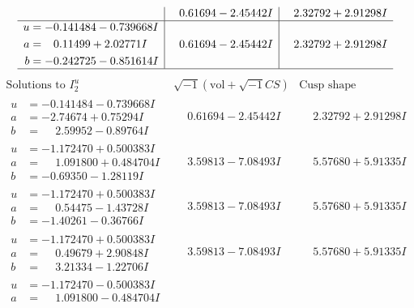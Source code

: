 \documentclass[1p]{elsarticle_modified}
\theoremstyle{definition}
\newcommand{\I}{\sqrt{-1}}
\begin{document}
$$\begin{array}{c|c|c}
 & \phantom{-}0.61694 - 2.45442 I & \phantom{-}2.32792 + 2.91298 I \\ \hline\begin{aligned}
u &= -0.141484 - 0.739668 I \\
a &= \phantom{-}0.11499 + 2.02771 I \\
b &= -0.242725 - 0.851614 I\end{aligned}
 & \phantom{-}0.61694 - 2.45442 I & \phantom{-}2.32792 + 2.91298 I\\
 \hline 
 \end{array}$$\newpage$$\begin{array}{c|c|c}  
\text{Solutions to }I^u_{2}& \I (\text{vol} + \sqrt{-1}CS) & \text{Cusp shape}\\
 \hline 
\begin{aligned}
u &= -0.141484 - 0.739668 I \\
a &= -2.74674 + 0.75294 I \\
b &= \phantom{-}2.59952 - 0.89764 I\end{aligned}
 & \phantom{-}0.61694 - 2.45442 I & \phantom{-}2.32792 + 2.91298 I \\ \hline\begin{aligned}
u &= -1.172470 + 0.500383 I \\
a &= \phantom{-}1.091800 + 0.484704 I \\
b &= -0.69350 - 1.28119 I\end{aligned}
 & \phantom{-}3.59813 - 7.08493 I & \phantom{-}5.57680 + 5.91335 I \\ \hline\begin{aligned}
u &= -1.172470 + 0.500383 I \\
a &= \phantom{-}0.54475 - 1.43728 I \\
b &= -1.40261 - 0.36766 I\end{aligned}
 & \phantom{-}3.59813 - 7.08493 I & \phantom{-}5.57680 + 5.91335 I \\ \hline\begin{aligned}
u &= -1.172470 + 0.500383 I \\
a &= \phantom{-}0.49679 + 2.90848 I \\
b &= \phantom{-}3.21334 - 1.22706 I\end{aligned}
 & \phantom{-}3.59813 - 7.08493 I & \phantom{-}5.57680 + 5.91335 I \\ \hline\begin{aligned}
u &= -1.172470 - 0.500383 I \\
a &= \phantom{-}1.091800 - 0.484704 I \\

\end{aligned}
\end{array}$$
\end{document}

